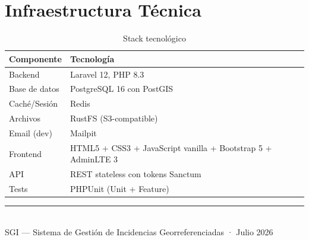 \documentclass[11pt, a4paper]{article}
\begin{document}
\section{Infraestructura Técnica}

\begin{table}[H]
\centering
\begin{tabularx}{\textwidth}{l X}
  \toprule
  \textbf{Componente} & \textbf{Tecnología} \\
  \midrule
  Backend       & Laravel 12, PHP 8.3 \\
  Base de datos & PostgreSQL 16 con PostGIS \\
  Caché/Sesión  & Redis \\
  Archivos      & RustFS (S3-compatible) \\
  Email (dev)   & Mailpit \\
  Frontend      & HTML5 + CSS3 + JavaScript vanilla + Bootstrap 5 + AdminLTE 3 \\
  API           & REST stateless con tokens Sanctum \\
  Tests         & PHPUnit (Unit + Feature) \\
  \bottomrule
\end{tabularx}
\caption{Stack tecnológico}
\end{table}

\vfill
\begin{center}
  \textcolor{muted}{\rule{0.4\textwidth}{0.5pt}}\\[0.5em]
  \small\textcolor{muted}{SGI — Sistema de Gestión de Incidencias Georreferenciadas · Julio 2026}
\end{center}
\end{document}
